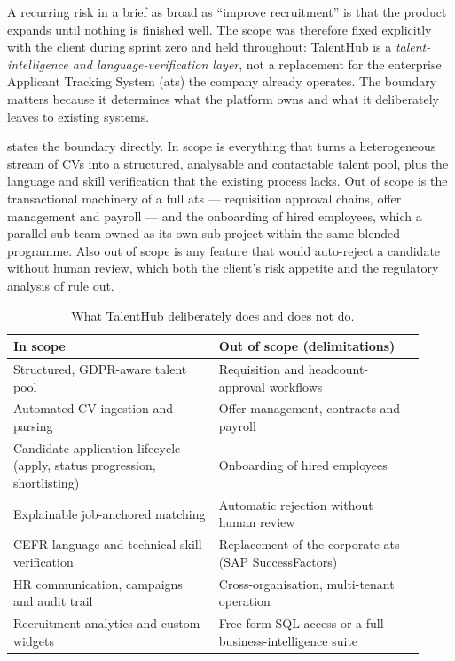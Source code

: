 A recurring risk in a brief as broad as ``improve recruitment'' is that the
product expands until nothing is finished well. The scope was therefore fixed
explicitly with the client during sprint zero and held throughout: TalentHub
is a \emph{talent-intelligence and language-verification layer}, not a
replacement for the enterprise Applicant Tracking System (\gls{ats}) the
company already operates. The boundary matters because it determines what the
platform owns and what it deliberately leaves to existing systems.

 states the boundary directly. In scope is everything
that turns a heterogeneous stream of CVs into a structured, analysable and
contactable talent pool, plus the language and skill verification that the
existing process lacks. Out of scope is the transactional machinery of a full
\gls{ats} --- requisition approval chains, offer management and payroll ---
and the onboarding of hired employees, which a parallel sub-team owned as its
own sub-project within the same \gls{blended} programme. Also out of scope is
any feature that would auto-reject a candidate without human review, which both
the client's risk appetite and the regulatory analysis of
 rule out.

\begin{table}[ht]
\centering
\caption[Project scope and delimitations]{What TalentHub deliberately does and
does not do.}
\label{tab:scope}
\small
\begin{tabular}{p{0.46\linewidth}p{0.46\linewidth}}
\toprule
\textbf{In scope} & \textbf{Out of scope (delimitations)} \\
\midrule
Structured, GDPR-aware talent pool & Requisition and headcount-approval workflows \\
Automated CV ingestion and parsing & Offer management, contracts and payroll \\
Candidate application lifecycle (apply, status progression, shortlisting) & Onboarding of hired employees \\
Explainable job-anchored matching & Automatic rejection without human review \\
CEFR language and technical-skill verification & Replacement of the corporate \gls{ats} (SAP SuccessFactors) \\
HR communication, campaigns and audit trail & Cross-organisation, multi-tenant operation \\
Recruitment analytics and custom widgets & Free-form SQL access or a full business-intelligence suite \\
\bottomrule
\end{tabular}
\end{table}

